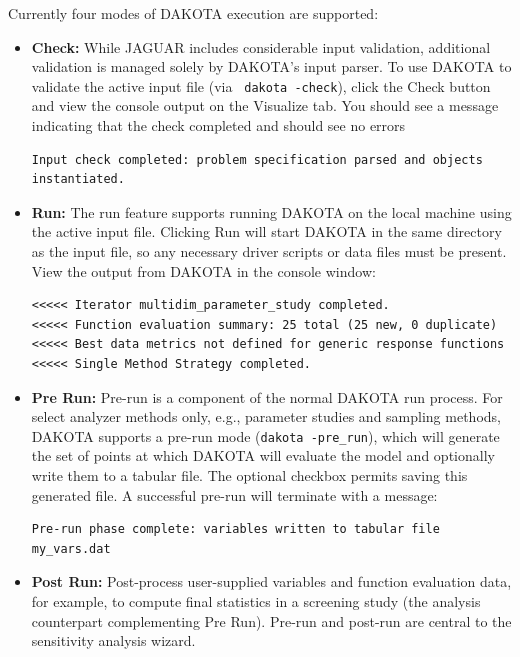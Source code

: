 Currently four modes of DAKOTA execution are supported:
\begin{itemize}

\item {\bf Check:} While JAGUAR includes considerable input
validation, additional validation is managed solely by DAKOTA's input
parser.  To use DAKOTA to validate the active input file (via {\tt
dakota -check}), click the Check button and view the console output on
the Visualize tab.  You should see a message indicating that the check
completed and should see no errors
\begin{small}
\begin{verbatim}
Input check completed: problem specification parsed and objects instantiated.
\end{verbatim}
\end{small}

\item {\bf Run:} The run feature supports running DAKOTA on the local
machine using the active input file.  Clicking Run will start DAKOTA
in the same directory as the input file, so any necessary driver
scripts or data files must be present.  View the output from DAKOTA in
the console window:

\begin{verbatim}
<<<<< Iterator multidim_parameter_study completed.
<<<<< Function evaluation summary: 25 total (25 new, 0 duplicate)
<<<<< Best data metrics not defined for generic response functions
<<<<< Single Method Strategy completed.
\end{verbatim}

\item {\bf Pre Run:} Pre-run is a component of the normal DAKOTA run
process.  For select analyzer methods only, e.g., parameter studies
and sampling methods, DAKOTA supports a pre-run mode ({\tt dakota
-pre\_run}), which will generate the set of points at which DAKOTA
will evaluate the model and optionally write them to a tabular file.
The optional checkbox permits saving this generated file.  A
successful pre-run will terminate with a message:

\begin{small}
\begin{verbatim}
Pre-run phase complete: variables written to tabular file my_vars.dat
\end{verbatim}
\end{small}

\item {\bf Post Run:} Post-process user-supplied variables and
function evaluation data, for example, to compute final statistics in
a screening study (the analysis counterpart complementing Pre Run).
Pre-run and post-run are central to the sensitivity analysis wizard.

\end{itemize}

